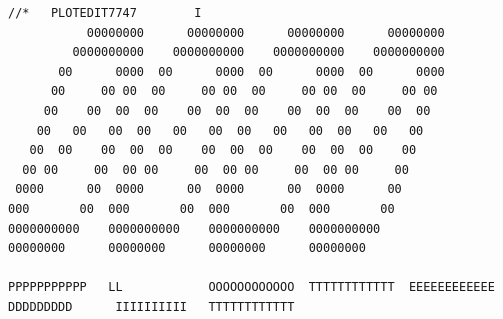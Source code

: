 {\fontsize{4}{5}\selectfont
\begin{verbatim}
//*   PLOTEDIT7747        I
           00000000      00000000      00000000      00000000
         0000000000    0000000000    0000000000    0000000000
       00      0000  00      0000  00      0000  00      0000
      00     00 00  00     00 00  00     00 00  00     00 00
     00    00  00  00    00  00  00    00  00  00    00  00
    00   00   00  00   00   00  00   00   00  00   00   00
   00  00    00  00  00    00  00  00    00  00  00    00
  00 00     00  00 00     00  00 00     00  00 00     00
 0000      00  0000      00  0000      00  0000      00
000       00  000       00  000       00  000       00
0000000000    0000000000    0000000000    0000000000
00000000      00000000      00000000      00000000

PPPPPPPPPPP   LL            OOOOOOOOOOOO  TTTTTTTTTTTT  EEEEEEEEEEEE  DDDDDDDDD      IIIIIIIIII   TTTTTTTTTTTT
\end{verbatim}
}
